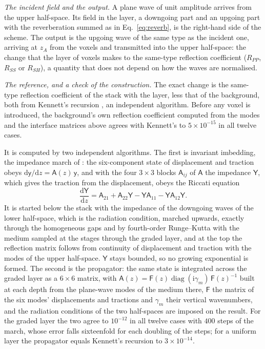 \documentclass[11pt,a4paper]{article}
\newcommand{\dd}{\mathrm{d}}
\begin{document}
\emph{The incident field and the output.} A plane wave of unit amplitude arrives from the upper
half-space. Its field in the layer, a downgoing part and an upgoing part with the reverberation summed
as in Eq.~\eqref{eq:reverb}, is the right-hand side of the scheme. The output is the upgoing wave of
the same type as the incident one, arriving at $z_A$ from the voxels and transmitted into the upper
half-space: the change that the layer of voxels makes to the same-type reflection coefficient ($R_{PP}$,
$R_{SS}$ or $R_{SH}$), a quantity that does not depend on how the waves are normalised.

\emph{The reference, and a check of the construction.} The exact change is the same-type reflection
coefficient of the stack with the layer, less that of the background, both from Kennett's recursion
\citep{Kennett1983}, an independent algorithm. Before any voxel is introduced, the background's own
reflection coefficient computed from the modes and the interface matrices above agrees with Kennett's
to $5\times10^{-15}$ in all twelve cases.

It is computed by two independent
algorithms. The first is invariant imbedding, the impedance march of \citet{Haines2004}: the
six-component state of displacement and traction obeys $\dd\mathsf{y}/\dd z=\mathsf{A}(z)\,\mathsf{y}$,
and with the four $3\times3$ blocks $\mathsf{A}_{ij}$ of $\mathsf{A}$ the impedance $\mathsf{Y}$, which
gives the traction from the displacement, obeys the Riccati equation
\begin{equation}\label{eq:riccati}
  \frac{\dd\mathsf{Y}}{\dd z}=\mathsf{A}_{21}+\mathsf{A}_{22}\mathsf{Y}-\mathsf{Y}\mathsf{A}_{11}
     -\mathsf{Y}\mathsf{A}_{12}\mathsf{Y}.
\end{equation}
It is started below the stack with the impedance of the downgoing waves of the lower half-space, which
is the radiation condition, marched upwards, exactly through the homogeneous gaps and by fourth-order
Runge--Kutta with the medium sampled at the stages through the graded layer, and at the top the
reflection matrix follows from continuity of displacement and traction with the modes of the upper
half-space. $\mathsf{Y}$ stays bounded, so no growing exponential is formed. The second is the
propagator: the same state is integrated across the graded layer as a $6\times6$ matrix, with
$\mathsf{A}(z)=\mathsf{F}(z)\operatorname{diag}(\mathrm{i}\gamma_m)\,\mathsf{F}(z)^{-1}$ built at each
depth from the plane-wave modes of the medium there, $\mathsf{F}$ the matrix of the six modes'
displacements and tractions and $\gamma_m$ their vertical wavenumbers, and the radiation conditions of
the two half-spaces are imposed on the result. For the graded layer the two agree to $10^{-12}$ in all
twelve cases with $400$ steps of the march, whose error falls sixteenfold for each doubling of the
steps; for a uniform layer the propagator equals Kennett's recursion to $3\times10^{-14}$. 
\end{document}
